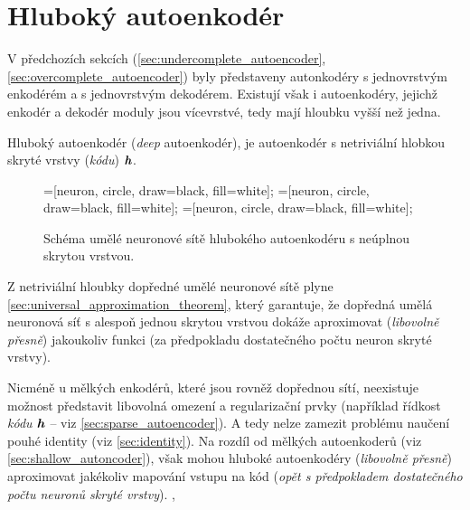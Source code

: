 \newpage
\section{Hluboký autoenkodér}
V předchozích sekcích (\autoref{sec:undercomplete_autoencoder}, \autoref{sec:overcomplete_autoencoder}) byly představeny autonkodéry s jednovrstvým enkodérém a s jednovrstvým dekodérem.
Existují však i autoenkodéry, jejichž enkodér a dekodér moduly jsou vícevrstvé, tedy mají hloubku vyšší než jedna.

Hluboký autoenkodér (\emph{deep} autoenkodér), je autoenkodér s netriviální hlobkou skryté vrstvy (\emph{kódu}) $\textbf{\emph{h}}$. \cite{Geron2019}

\begin{figure}[H]
    \centering
    \begin{neuralnetwork}[height=6]
        =[neuron, circle, draw=black, fill=white];
        =[neuron, circle, draw=black, fill=white];
        =[neuron, circle, draw=black, fill=white];
      
        \hiddenlayer[count=4, bias=false]
        \linklayers
        \hiddenlayer[count=2, bias=false]
        \linklayers
        \hiddenlayer[count=4, bias=false]
        \linklayers
        \outputlayer[count=6, text=\xout]
        \linklayers
      \end{neuralnetwork}
    \caption{Schéma umělé neuronové sítě hlubokého autoenkodéru s neúplnou skrytou vrstvou.}
    \label{fig:stacked_autoencoder}
\end{figure}

Z netriviální hloubky dopředné umělé neuronové sítě plyne \autoref{sec:universal_approximation_theorem},
který garantuje, že dopředná umělá neuronová síť s alespoň jednou skrytou vrstvou dokáže aproximovat (\emph{libovolně přesně}) jakoukoliv funkci (za předpokladu dostatečného počtu neuron skryté vrstvy). \cite{Goodfellow2016}

Nicméně u mělkých enkodérů, které jsou rovněž dopřednou sítí, neexistuje možnost představit libovolná omezení a regularizační prvky (například řídkost \emph{kódu} $\textbf{\emph{h}}$ – viz \autoref{sec:sparse_autoencoder}).
A tedy nelze zamezit problému naučení pouhé identity (viz \autoref{sec:identity}). Na rozdíl od mělkých autoenkoderů (viz \autoref{sec:shallow_autoncoder}),
však mohou hluboké autoenkodéry (\emph{libovolně přesně}) aproximovat jakékoliv mapování vstupu na kód (\emph{opět s předpokladem dostatečného počtu neuronů skryté vrstvy}). \cite{Goodfellow2016}, \cite{Charte2018}

